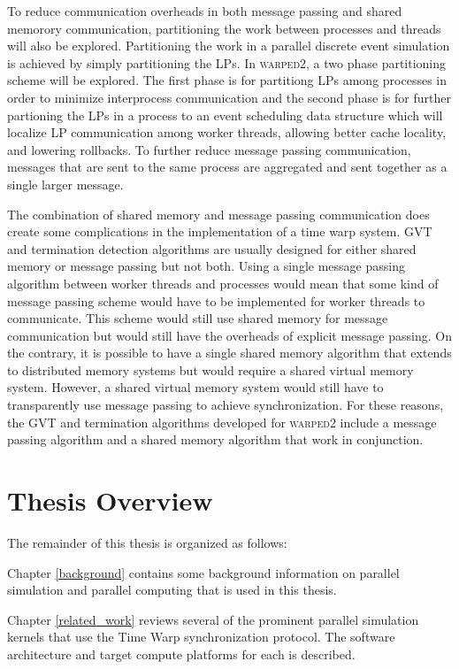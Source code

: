 \documentclass[11pt]{book}
\begin{document}
To reduce communication overheads in both message passing and shared memorory communication,
partitioning the work between processes and threads will also be explored. Partitioning
the work in a parallel discrete event simulation is achieved by simply partitioning the
LPs. In \textsc{warped2}, a two phase partitioning scheme will be explored. The first phase
is for partitiong LPs among processes in order to minimize interprocess communication and the
second phase is for further partioning the LPs in a process to an event scheduling data structure
which will localize LP communication among worker threads, allowing better cache locality,
and lowering rollbacks. To further reduce message passing communication, messages that are
sent to the same process are aggregated and sent together as a single larger message.

The combination of shared memory and message passing communication does create some
complications in the implementation of a time warp system. GVT and termination detection
algorithms are usually designed for either shared memory or message passing but not both.
Using a single message passing algorithm between worker threads and processes would mean
that some kind of message passing scheme would have to be implemented for worker threads
to communicate. This scheme would still use shared memory for message communication but
would still have the overheads of explicit message passing. On the contrary, it is possible
to have a single shared memory algorithm that extends to distributed memory systems but
would require a shared virtual memory system. However, a shared virtual memory system would still
have to transparently use message passing to achieve synchronization. For these reasons,
the GVT and termination algorithms developed for \textsc{warped2} include a message
passing algorithm and a shared memory algorithm that work in conjunction.

\section{Thesis Overview}

The remainder of this thesis is organized as follows:

Chapter \ref{background} contains some background information on parallel simulation and
parallel computing that is used in this thesis.

Chapter \ref{related_work} reviews several of the prominent parallel simulation kernels
that use the Time Warp synchronization protocol. The software architecture and target
compute platforms for each is described.
\end{document}
